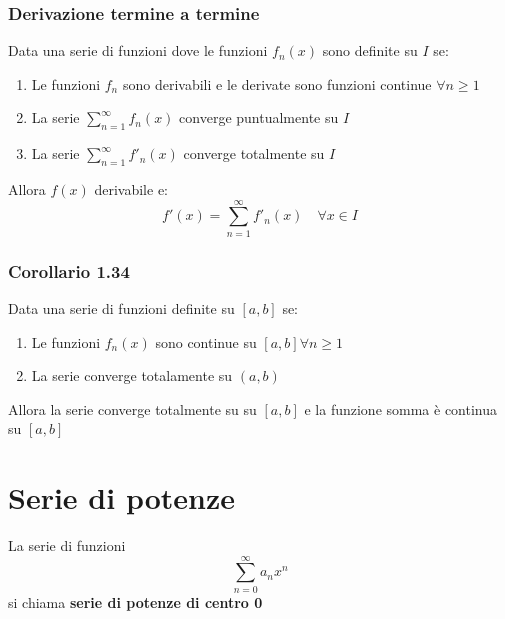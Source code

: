 \documentclass[12pt, a4paper]{article}
\begin{document}
        \subsubsection{Derivazione termine a termine}
            Data una serie di funzioni dove le funzioni $f_n(x)$ sono definite su $I$ se:
            \begin{enumerate}
                \item Le funzioni $f_n$ sono derivabili e le derivate sono funzioni continue $\forall n\geq 1$
                \item La serie $\sum_{n=1}^{\infty}f_n(x)$ converge puntualmente su $I$
                \item La serie $\sum_{n=1}^{\infty}f'_n(x)$ converge totalmente su $I$
            \end{enumerate}
            Allora $f(x)$ derivabile e:
            \begin{equation*}
                f'(x) = \sum_{n=1}^{\infty}f'_n(x) \quad \forall x\in I
            \end{equation*}
        \subsubsection{Corollario 1.34}
            Data una serie di funzioni definite su $[a,b]$ se:
            \begin{enumerate}
                \item Le funzioni $f_n(x)$ sono continue su $[a,b]\forall n\geq 1$
                \item La serie converge totalamente su $(a,b)$
            \end{enumerate}
            Allora la serie converge totalmente su su $[a,b]$ e la funzione somma è continua su $[a,b]$
\section{Serie di potenze}
    La serie di funzioni
    \begin{equation*}
        \sum_{n=0}^{\infty}a_n x^n
    \end{equation*}            
    si chiama \textbf{serie di potenze di centro 0}
\end{document}
